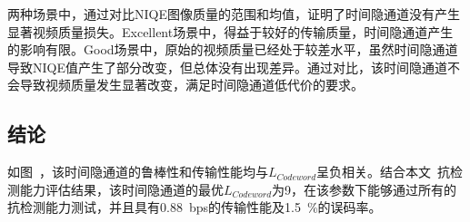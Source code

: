 两种场景中，通过对比NIQE图像质量的范围和均值，证明了时间隐通道没有产生显著视频质量损失。Excellent场景中，得益于较好的传输质量，时间隐通道产生的影响有限。Good场景中，原始的视频质量已经处于较差水平，虽然时间隐通道导致NIQE值产生了部分改变，但总体没有出现差异。通过对比，该时间隐通道不会导致视频质量发生显著改变，满足时间隐通道低代价的要求。

\subsection{结论}
\label{chap:zigzag:results:conclusion}


如图\ ，该时间隐通道的鲁棒性和传输性能均与$L_{Codeword}$呈负相关。结合本文\ 抗检测能力评估结果，该时间隐通道的最优$L_{Codeword}$为9，在该参数下能够通过所有的抗检测能力测试，并且具有{0.88\ bps}的传输性能及{1.5\ \%}的误码率。

